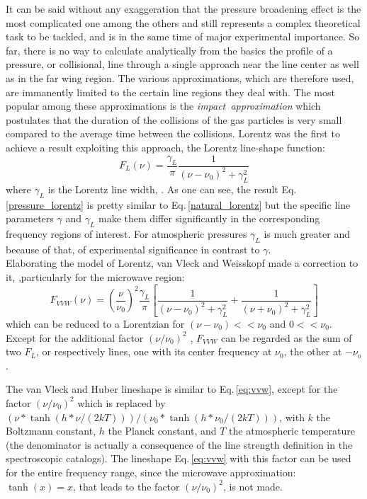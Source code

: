 It can be said without any exaggeration that the pressure broadening
effect is the most complicated one among the others and still
represents a complex theoretical task to be tackled, and is in the
same time of major experimental importance. So far, there is no way to
calculate analytically from the basics the profile of a pressure, or
collisional, line through a single approach near the line center as
well as in the far wing region. The various approximations, which are
therefore used, are immanently limited to the certain line regions
they deal with.  The most popular among these approximations is the
{\it{impact~approximation}} which postulates that the duration of the
collisions of the gas particles is very small compared to the average
time between the collisions. Lorentz was the first to achieve a result
exploiting this approach, the Lorentz line-shape function:
\begin{equation}\label{pressure_lorentz}
 F_L(\nu)=\frac{\gamma_L}{\pi}\frac{1}{(\nu-\nu_0)^2+\gamma_L^2}
\end{equation}
where $\gamma_L$ is the Lorentz line width, \citet{thorne:99}. As one
can see, the result Eq.\,\ref{pressure_lorentz} is pretty similar to
Eq.\,\ref{natural_lorentz} but the specific line parameters $\gamma$
and $\gamma_L$ make them differ significantly in the corresponding
frequency regions of interest. For atmospheric pressures $\gamma_L$ is
much greater and because of that, of experimental
significance in contrast to $\gamma$.\\
Elaborating the model of Lorentz, van Vleck and Weisskopf made a
correction to it, \citet{vanvleck:45},particularly for the microwave
region:
\begin{equation}\label{eq:vvw}
 F_{VVW} (\nu)=\left(\frac{\nu}{\nu_0}\right)^2\frac{\gamma_L}{\pi}
 \left[\frac{1}{(\nu-\nu_0)^2+\gamma_L^2}+\frac{1}{(\nu+\nu_0)^2+\gamma_L^2}\right]
\end{equation}
which can be reduced to a Lorentzian for $(\nu-\nu_0) << \nu_0$ and $0
<< \nu_0$. Except for the additional factor $(\nu/\nu_0)^2$ ,
$F_{VVW}$ can be regarded as the sum of two $F_L$, or respectively
lines, one with its center frequency at $\nu_0$, the other at
$-\nu_o$.

The van Vleck and Huber lineshape \citep{vanvleckhuber:77} is similar
to Eq.\,\ref{eq:vvw}, except for the factor $(\nu/\nu_0)^2$ which is
replaced by $(\nu * \tanh(h*\nu/(2kT)))/(\nu_0 *
\tanh(h*\nu_0/(2kT)))$, with $k$ the Boltzmann constant, $h$ the Planck
constant, and $T$ the atmospheric temperature (the denominator is
actually a consequence of the line strength definition in the
spectroscopic catalogs). The lineshape Eq.\,\ref{eq:vvw} with this
factor can be used for the entire frequency range, since
the microwave approximation: $\tanh(x) = x$, that leads to the factor
$(\nu/\nu_0)^2$, is not made.

